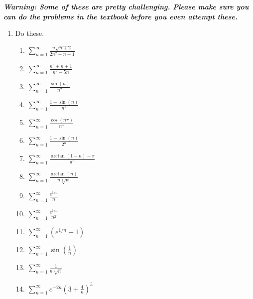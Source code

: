 \documentclass[11pt]{article}
\begin{document}
\noindent \emph{\textbf{Warning: Some of these are pretty challenging. Please
make sure you can do the problems in the textbook before you even attempt
these.}}

\begin{enumerate}

  \item Do these. \begin{enumerate}

    \item $\displaystyle \sum_{n=1}^\infty
    \frac{n\sqrt{n+2}}{2n^2-n+1}$

    \item $\displaystyle \sum_{n=1}^\infty
    \frac{n^3+n+1}{n^2-5n}$

    \item $\displaystyle \sum_{n=1}^\infty
    \frac{\sin(n)}{n^2}$

    \item $\displaystyle \sum_{n=1}^\infty
    \frac{1-\sin(n)}{n^2}$

    \item $\displaystyle \sum_{n=1}^\infty
    \frac{\cos(n\pi)}{n^3}$

    \item $\displaystyle \sum_{n=1}^\infty
    \frac{1+\sin(n)}{2^n}$

    \item $\displaystyle \sum_{n=1}^\infty
    \frac{\arctan(1-n) - \pi}{\pi^n}$

    \item $\displaystyle \sum_{n=1}^\infty
    \frac{\arctan(n)}{n\sqrt[3]n}$

    \item $\displaystyle \sum_{n=1}^\infty
    \frac{e^{1/n}}{n}$

    \item $\displaystyle \sum_{n=1}^\infty
    \frac{e^{1/n}}{n^2}$

    \item $\displaystyle \sum_{n=1}^\infty
    \left( e^{1/n} - 1 \right)$

    \item $\displaystyle \sum_{n=1}^\infty
    \sin\left( \frac1n \right)$

    \item $\displaystyle \sum_{n=1}^\infty
    \frac1{n\sqrt[n]n}$

    \item $\displaystyle \sum_{n=1}^\infty
    e^{-2n} \left( 3 + \frac4n \right)^5$


\end{enumerate}
\end{enumerate}
\end{document}
